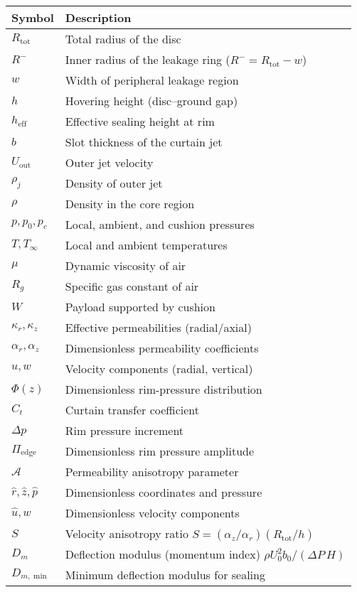 \documentclass[11pt,a4paper]{article}
\begin{document}
\begin{tabular}{@{}ll@{}}
\toprule
Symbol & Description \\ \midrule
$R_{\mathrm{tot}}$ & Total radius of the disc \\
$R^{-}$ & Inner radius of the leakage ring ($R^{-}=R_{\mathrm{tot}}-w$) \\
$w$ & Width of peripheral leakage region \\
$h$ & Hovering height (disc--ground gap) \\
$h_{\mathrm{eff}}$ & Effective sealing height at rim \\
$b$ & Slot thickness of the curtain jet \\
$U_{\mathrm{out}}$ & Outer jet velocity \\
$\rho_j$ & Density of outer jet \\
$\rho$ & Density in the core region \\
$p,p_0,p_c$ & Local, ambient, and cushion pressures \\
$T,T_\infty$ & Local and ambient temperatures \\
$\mu$ & Dynamic viscosity of air \\
$R_g$ & Specific gas constant of air \\
$W$ & Payload supported by cushion \\
$\kappa_r,\kappa_z$ & Effective permeabilities (radial/axial) \\
$\alpha_r,\alpha_z$ & Dimensionless permeability coefficients \\
$u,w$ & Velocity components (radial, vertical) \\
$\Phi(z)$ & Dimensionless rim-pressure distribution \\
$C_t$ & Curtain transfer coefficient \\
$\Delta p$ & Rim pressure increment \\
$\Pi_{\mathrm{edge}}$ & Dimensionless rim pressure amplitude \\
$\mathcal{A}$ & Permeability anisotropy parameter \\
$\hat r,\hat z,\hat p$ & Dimensionless coordinates and pressure \\
$\hat u,\hat w$ & Dimensionless velocity components \\
$S$ & Velocity anisotropy ratio $S=(\alpha_z/\alpha_r)(R_{\mathrm{tot}}/h)$ \\ $D_m$ & Deflection modulus (momentum index) $\rho U_0^2 b_0/(\Delta P\,H)$ \\
$D_{m,\min}$ & Minimum deflection modulus for sealing \\

\end{tabular}
\end{document}
